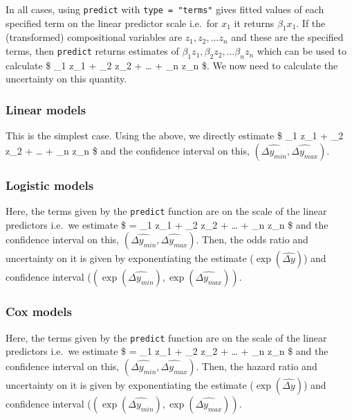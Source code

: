 \documentclass[
]{article}
\begin{document}
In all cases, using \texttt{predict} with \texttt{type\ =\ "terms"}
gives fitted values of each specified term on the linear predictor scale
i.e.~for \(x_1\) it returns \(\beta_1 x_1\). If the (transformed)
compositional variables are \(z_1, z_2, ... z_n\) and these are the
specified terms, then \texttt{predict} returns estimates of
\(\beta_1 z_1, \beta_2 z_2, ... \beta_n z_n\) which can be used to
calculate \$  \beta\_1 z\_1 + \beta\_2 z\_2 + \ldots{}
+ \beta\_n z\_n \$. We now need to calculate the uncertainty on this
quantity.

\hypertarget{linear-models}{%
\subsubsection{Linear models}\label{linear-models}}

This is the simplest case. Using the above, we directly estimate \$
 \beta\_1 z\_1 + \beta\_2 z\_2 + \ldots{} + \beta\_n
z\_n \$ and the confidence interval on this,
\((\widehat{\Delta y_{min}}, \widehat{\Delta y_{max}})\).

\hypertarget{logistic-models}{%
\subsubsection{Logistic models}\label{logistic-models}}

Here, the terms given by the \texttt{predict} function are on the scale
of the linear predictors i.e.~we estimate \$  =
\beta\_1 z\_1 + \beta\_2 z\_2 + \ldots{} + \beta\_n z\_n \$ and the
confidence interval on this,
\((\widehat{\Delta y_{min}}, \widehat{\Delta y_{max}})\). Then, the odds
ratio and uncertainty on it is given by exponentiating the estimate
(\(\exp(\widehat{\Delta y})\)) and confidence interval
(\((\exp(\widehat{\Delta y_{min}}), \exp(\widehat{\Delta y_{max}}))\).

\hypertarget{cox-models}{%
\subsubsection{Cox models}\label{cox-models}}

Here, the terms given by the \texttt{predict} function are on the scale
of the linear predictors i.e.~we estimate \$  =
\beta\_1 z\_1 + \beta\_2 z\_2 + \ldots{} + \beta\_n z\_n \$ and the
confidence interval on this,
\((\widehat{\Delta y_{min}}, \widehat{\Delta y_{max}})\). Then, the
hazard ratio and uncertainty on it is given by exponentiating the
estimate (\(\exp(\widehat{\Delta y})\)) and confidence interval
(\((\exp(\widehat{\Delta y_{min}}), \exp(\widehat{\Delta y_{max}}))\).
\end{document}
